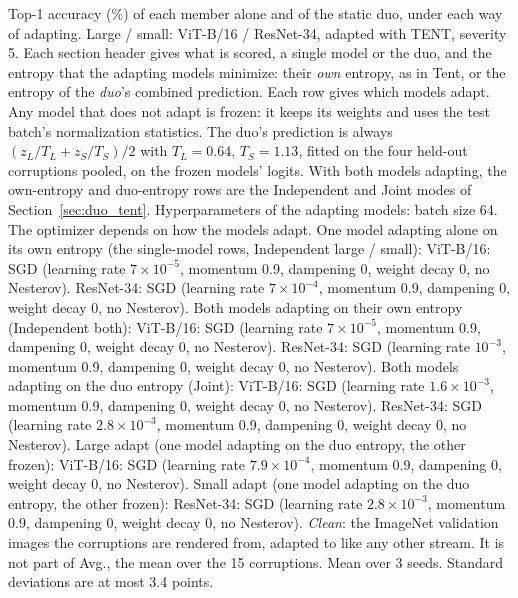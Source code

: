 \begin{table}[t]
    \centering
    \small
    \setlength{\tabcolsep}{3.5pt}
    \caption{Top-1 accuracy (\%) of each member alone and of the static duo, under each way of adapting. Large / small: ViT-B/16 / ResNet-34, adapted with TENT, severity 5. Each section header gives what is scored, a single model or the duo, and the entropy that the adapting models minimize: their \emph{own} entropy, as in Tent, or the entropy of the \emph{duo}'s combined prediction. Each row gives which models adapt. Any model that does not adapt is frozen: it keeps its weights and uses the test batch's normalization statistics. The duo's prediction is always $(z_L / T_L + z_S / T_S) / 2$ with $T_L = 0.64$, $T_S = 1.13$, fitted on the four held-out corruptions pooled, on the frozen models' logits. With both models adapting, the own-entropy and duo-entropy rows are the Independent and Joint modes of Section~\ref{sec:duo_tent}. Hyperparameters of the adapting models: batch size 64. The optimizer depends on how the models adapt. One model adapting alone on its own entropy (the single-model rows, Independent large / small): ViT-B/16: SGD (learning rate $7 \times 10^{-5}$, momentum 0.9, dampening 0, weight decay 0, no Nesterov). ResNet-34: SGD (learning rate $7 \times 10^{-4}$, momentum 0.9, dampening 0, weight decay 0, no Nesterov). Both models adapting on their own entropy (Independent both): ViT-B/16: SGD (learning rate $7 \times 10^{-5}$, momentum 0.9, dampening 0, weight decay 0, no Nesterov). ResNet-34: SGD (learning rate $10^{-3}$, momentum 0.9, dampening 0, weight decay 0, no Nesterov). Both models adapting on the duo entropy (Joint): ViT-B/16: SGD (learning rate $1.6 \times 10^{-3}$, momentum 0.9, dampening 0, weight decay 0, no Nesterov). ResNet-34: SGD (learning rate $2.8 \times 10^{-3}$, momentum 0.9, dampening 0, weight decay 0, no Nesterov). Large adapt (one model adapting on the duo entropy, the other frozen): ViT-B/16: SGD (learning rate $7.9 \times 10^{-4}$, momentum 0.9, dampening 0, weight decay 0, no Nesterov). Small adapt (one model adapting on the duo entropy, the other frozen): ResNet-34: SGD (learning rate $2.8 \times 10^{-3}$, momentum 0.9, dampening 0, weight decay 0, no Nesterov). \emph{Clean}: the ImageNet validation images the corruptions are rendered from, adapted to like any other stream. It is not part of Avg., the mean over the 15 corruptions. Mean over 3 seeds. Standard deviations are at most 3.4 points.}

\end{table}
